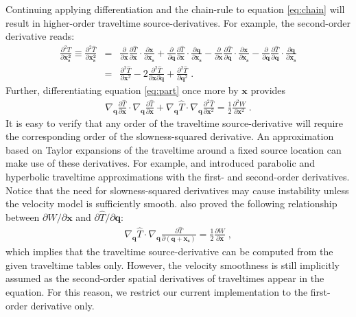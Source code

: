 Continuing applying differentiation and the chain-rule to equation \ref{eq:chain} will 
result in higher-order traveltime source-derivatives. For example, the second-order 
derivative reads:
\begin{eqnarray}
\frac{\partial^2 T}{\partial \mathbf{x_s^2}} \equiv 
\frac{\partial^2 \hat{T}}{\partial \mathbf{x_s^2}} & = & 
\frac{\partial}{\partial \mathbf{x}} \frac{\partial \hat{T}}{\partial \mathbf{x}} 
\cdot \frac{\partial \mathbf{x}}{\partial \mathbf{x_s}} + 
\frac{\partial}{\partial \mathbf{q}} \frac{\partial \hat{T}}{\partial \mathbf{x}} 
\cdot \frac{\partial \mathbf{q}}{\partial \mathbf{x_s}} - 
\frac{\partial}{\partial \mathbf{x}} \frac{\partial \hat{T}}{\partial \mathbf{q}} 
\cdot \frac{\partial \mathbf{x}}{\partial \mathbf{x_s}} - 
\frac{\partial}{\partial \mathbf{q}} \frac{\partial \hat{T}}{\partial \mathbf{q}} 
\cdot \frac{\partial \mathbf{q}}{\partial \mathbf{x_s}} \nonumber \\
& = & \frac{\partial^2 \hat{T}}{\partial \mathbf{x}^2} 
- 2 \frac{\partial^2 \hat{T}}{\partial \mathbf{x} \partial \mathbf{q}} 
+ \frac{\partial^2 \hat{T}}{\partial \mathbf{q}^2}\;.
\end{eqnarray}
Further, differentiating equation \ref{eq:part} once more by $\mathbf{x}$ provides 
\begin{eqnarray}
\nabla_{\mathbf{q}} \frac{\partial \hat{T}}{\partial \mathbf{x}} \cdot 
\nabla_{\mathbf{q}} \frac{\partial \hat{T}}{\partial \mathbf{x}} 
+ \nabla_{\mathbf{q}} \hat{T} \cdot 
\nabla_{\mathbf{q}} \frac{\partial^2 \hat{T}}{\partial \mathbf{x}^2} 
= \frac{1}{2} \frac{\partial^2 W}{\partial \mathbf{x}^2}\;.
\end{eqnarray}
It is easy to verify that any order of the traveltime source-derivative will require the 
corresponding order of the slowness-squared derivative. An approximation based on Taylor 
expansions of the traveltime around a fixed source location can make use of these derivatives. 
For example, \cite{ursin} and \cite{bortfeld} introduced parabolic and hyperbolic traveltime 
approximations with the first- and second-order derivatives. Notice that the need for slowness-squared 
derivatives may cause instability unless the velocity model is sufficiently smooth. \cite{alkhalifah3} 
also proved the following relationship between $\partial W/\partial \mathbf{x}$ and 
$\partial \hat{T}/\partial \mathbf{q}$: 
\begin{eqnarray}
\nabla_{\mathbf{q}} \hat{T} \cdot 
\nabla_{\mathbf{q}} \frac{\partial \hat{T}}{\partial \mathbf{(q+x_s)}} 
= \frac{1}{2} \frac{\partial W}{\partial \mathbf{x}}\;,
\end{eqnarray}
which implies that the traveltime source-derivative can be computed from the given traveltime 
tables only. However, the velocity smoothness is still implicitly assumed as the second-order spatial 
derivatives of traveltimes appear in the equation. For this reason, we restrict our current implementation 
to the first-order derivative only.

